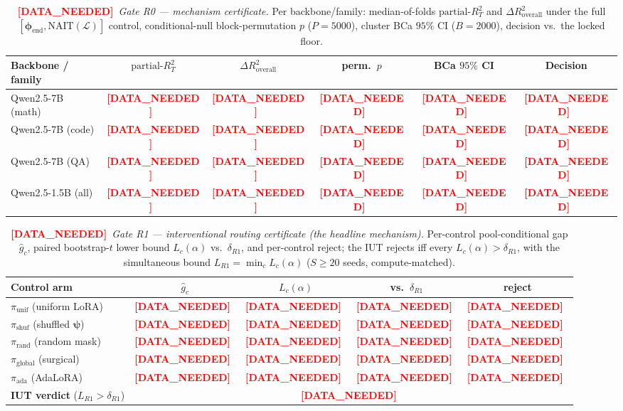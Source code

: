 \documentclass[11pt]{article}
\theoremstyle{definition}
\newcommand{\phend}{\bm{\phi}_{\mathrm{end}}}
\newcommand{\Lset}{\mathcal{L}}
\newcommand{\psivec}{\bm{\psi}}
\newcommand{\dataneeded}[1]{\textcolor{red}{\textbf{[DATA\_NEEDED]}}~\emph{#1}}
\begin{document}
\begin{table}[t]
\centering
\caption{\dataneeded{Gate R0 --- mechanism certificate.} Per backbone/family: median-of-folds
$\mathrm{partial\text{-}}R^2_T$ and $\Delta R^2_{\mathrm{overall}}$ under the full
$[\phend,\mathrm{NAIT}(\Lset)]$ control, conditional-null block-permutation $p$ ($P{=}5000$),
cluster BCa $95\%$ CI ($B{=}2000$), decision vs.\ the locked floor.}
\label{tab:r0}
\begin{tabular}{lccccc}
\toprule
Backbone / family & $\mathrm{partial\text{-}}R^2_T$ & $\Delta R^2_{\mathrm{overall}}$ & perm.\ $p$ & BCa $95\%$ CI & Decision \\
\midrule
Qwen2.5-7B (math)   & \dataneeded{} & \dataneeded{} & \dataneeded{} & \dataneeded{} & \dataneeded{} \\
Qwen2.5-7B (code)   & \dataneeded{} & \dataneeded{} & \dataneeded{} & \dataneeded{} & \dataneeded{} \\
Qwen2.5-7B (QA)     & \dataneeded{} & \dataneeded{} & \dataneeded{} & \dataneeded{} & \dataneeded{} \\
Qwen2.5-1.5B (all)  & \dataneeded{} & \dataneeded{} & \dataneeded{} & \dataneeded{} & \dataneeded{} \\
\bottomrule
\end{tabular}
\end{table}

\begin{table}[t]
\centering
\caption{\dataneeded{Gate R1 --- interventional routing certificate (the headline mechanism).}
Per-control pool-conditional gap $\hat g_c$, paired bootstrap-$t$ lower bound $L_c(\alpha)$
vs.\ $\delta_{R1}$, and per-control reject; the IUT rejects iff every $L_c(\alpha)>\delta_{R1}$,
with the simultaneous bound $L_{R1}=\min_c L_c(\alpha)$ ($S\ge20$ seeds, compute-matched).}
\label{tab:r1}
\begin{tabular}{lcccc}
\toprule
Control arm & $\hat g_c$ & $L_c(\alpha)$ & vs.\ $\delta_{R1}$ & reject \\
\midrule
$\pi_{\mathrm{unif}}$ (uniform LoRA)      & \dataneeded{} & \dataneeded{} & \dataneeded{} & \dataneeded{} \\
$\pi_{\mathrm{shuf}}$ (shuffled $\psivec$) & \dataneeded{} & \dataneeded{} & \dataneeded{} & \dataneeded{} \\
$\pi_{\mathrm{rand}}$ (random mask)        & \dataneeded{} & \dataneeded{} & \dataneeded{} & \dataneeded{} \\
$\pi_{\mathrm{global}}$ (surgical)         & \dataneeded{} & \dataneeded{} & \dataneeded{} & \dataneeded{} \\
$\pi_{\mathrm{ada}}$ (AdaLoRA)             & \dataneeded{} & \dataneeded{} & \dataneeded{} & \dataneeded{} \\
\midrule
\textbf{IUT verdict} ($L_{R1}{>}\delta_{R1}$) & \multicolumn{4}{c}{\dataneeded{}} \\
\bottomrule
\end{tabular}
\end{table}
\end{document}
